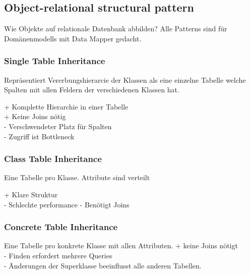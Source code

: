 \subsection{Object-relational structural pattern}
Wie Objekte auf relationale Datenbank abbilden?
Alle Patterns sind für Domänenmodells mit Data Mapper gedacht.
\subsubsection{Single Table Inheritance}
Repräsentiert Vererbungshierarcie der Klassen als eine einzelne Tabelle welche Spalten mit allen
Feldern der verschiedenen Klassen hat.

+ Komplette Hierarchie in einer Tabelle\\
+ Keine Joins nötig \\
- Verschwendeter Platz für Spalten\\
- Zugriff ist Bottleneck

\subsubsection{Class Table Inheritance}
Eine Tabelle pro Klasse. Attribute sind verteilt

+ Klare Struktur \\
- Schlechte performance
- Benötigt Joins
\subsubsection{Concrete Table Inheritance}
Eine Tabelle pro konkrete Klasse mit allen Attributen.
+ keine Joins nötigt \\
- Finden erfordert mehrere Queries \\
- Änderungen der Superklasse beeinflusst alle anderen Tabellen.

